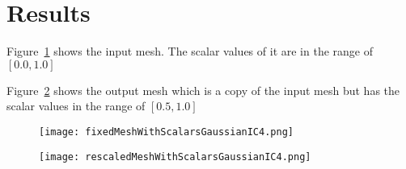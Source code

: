 \documentclass{InsightArticle}
\begin{document}
\section{Results}
Figure~\ref{fig:InputMesh} shows the input mesh.
The scalar values of it are in the range of $[0.0, 1.0]$

Figure~\ref{fig:OutputMesh} shows the output mesh which is a copy of the input mesh but
has the scalar values in the range of $[0.5, 1.0]$

\begin{figure}
\center
\texttt{[image: fixedMeshWithScalarsGaussianIC4.png]}
\label{fig:InputMesh}
\end{figure}

\begin{figure}
\center
\texttt{[image: rescaledMeshWithScalarsGaussianIC4.png]}
\label{fig:OutputMesh}
\end{figure}

\clearpage

%
%



\end{document}
